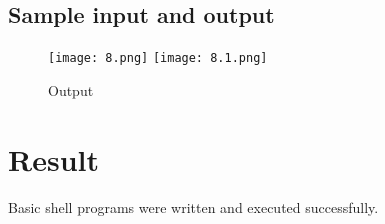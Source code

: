 \documentclass{article}
\begin{document}
\subsection{Sample input and output}
\begin{figure}[H]
    \centering
    \texttt{[image: 8.png]}
    \texttt{[image: 8.1.png]}
    \caption{Output}
    \label{fig:my_label2}
\end{figure}

\section*{\Large Result}
    Basic shell programs were written and executed successfully.
\end{document}
